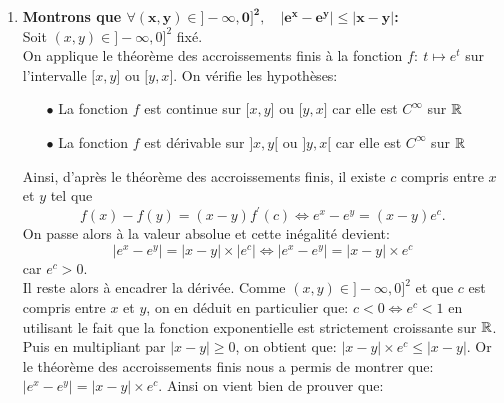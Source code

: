 \documentclass[a4paper, 11pt,reqno]{article}
\begin{document}
\begin{correction}
\begin{enumerate}
		      $$\tan{(x)}<\ddp\frac{x}{\cos^2{(x)}}.$$
		      On a donc bien finalement que: 
		\item \textbf{Montrons que $\mathbf{\forall (x,y)\in\rbrack -\infty,0\rbrack^2,\quad |e^x-e^y|\leq |x-y|}$:}\\
		      \noindent Soit $(x,y)\in\rbrack -\infty,0\rbrack^2$ fix\'e.\\
		      \noindent On applique le th\'eor\`eme des accroissements finis \`a la fonction $f:\ t\mapsto e^t$ sur l'intervalle $\lbrack x,y\rbrack$ ou $\lbrack y,x\rbrack$. On v\'erifie les hypoth\`eses:
		      \begin{itemize}
			      \item[$\bullet$] La fonction $f$ est continue sur $\lbrack x,y\rbrack$ ou $\lbrack y,x\rbrack$ car elle est $C^{\infty}$ sur $\mathbb{R}$
			      \item[$\bullet$]  La fonction $f$ est d\'erivable sur $\rbrack x,y\lbrack$ ou $\rbrack y,x\lbrack$ car elle est $C^{\infty}$ sur $\mathbb{R}$
		      \end{itemize}
		      Ainsi, d'apr\`es le th\'eor\`eme des accroissements finis, il existe $c$ compris entre $x$ et $y$ tel que
		      $$f(x)-f(y)=(x-y)f^{\prime}(c)\Leftrightarrow e^x-e^y=(x-y)e^c.$$
		      On passe alors \`{a} la valeur absolue et cette in\'egalit\'e devient:
		      $$\left| e^x-e^y \right|= \left| x-y \right|\times |e^c|\Leftrightarrow \left| e^x-e^y \right|= \left| x-y \right|\times e^c$$
		      car $e^c>0$.\\
		      \noindent Il reste alors \`{a} encadrer la d\'eriv\'ee. Comme $(x,y)\in\rbrack -\infty,0\rbrack^2$ et que $c$ est compris entre $x$ et $y$, on  en d\'eduit en particulier que: $c<0\Leftrightarrow e^c<1$ en utilisant le fait que la fonction exponentielle est strictement croissante sur $\mathbb{R}$. Puis en multipliant par $\left| x-y\right|\geq 0$, on obtient que: $ \left| x-y \right|\times e^c \leq  \left| x-y \right|$. Or le th\'eor\`{e}me des accroissements finis nous a permis de montrer que: $\left| e^x-e^y \right|= \left| x-y \right|\times e^c$. Ainsi on vient bien de prouver que: 
	\end{enumerate}
\end{correction}
\end{document}
